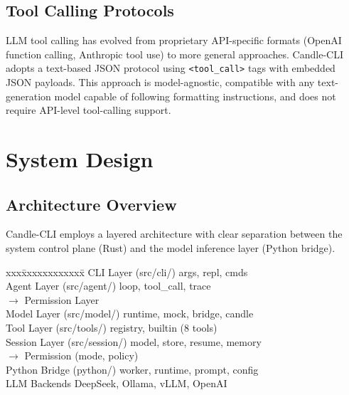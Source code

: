 \documentclass[11pt]{article}
\begin{document}
\subsection{Tool Calling Protocols}

LLM tool calling has evolved from proprietary API-specific formats (OpenAI function calling, Anthropic tool use) to more general approaches. Candle-CLI adopts a text-based JSON protocol using \texttt{<tool\_call>} tags with embedded JSON payloads. This approach is model-agnostic, compatible with any text-generation model capable of following formatting instructions, and does not require API-level tool-calling support.

\section{System Design}
\label{sec:design}

\subsection{Architecture Overview}

Candle-CLI employs a layered architecture with clear separation between the system control plane (Rust) and the model inference layer (Python bridge).

\begin{center}
\begin{minipage}{0.45\textwidth}
\footnotesize\ttfamily
\begin{tabbing}
xxx\=xxxxxxxxxxxx\=\kill
CLI Layer          \> (src/cli/)   \> args, repl, cmds\\
Agent Layer        \> (src/agent/) \> loop, tool\_call, trace\\
                   \>              \> $\to$ Permission Layer\\
Model Layer        \> (src/model/) \> runtime, mock, bridge, candle\\
Tool Layer         \> (src/tools/) \> registry, builtin (8 tools)\\
Session Layer      \> (src/session/)\> model, store, resume, memory\\
                   \>              \> $\to$ Permission (mode, policy)\\
Python Bridge      \> (python/)    \> worker, runtime, prompt, config\\
LLM Backends       \>              \> DeepSeek, Ollama, vLLM, OpenAI
\end{tabbing}
\end{minipage}
\end{center}
\end{document}
